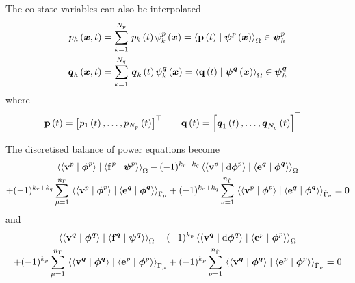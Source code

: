 The co-state variables can also be interpolated \ie
\begin{align}
  \fnof{p_{h}}{\vectr{x},t}&=\gsum{k=1}{N_{p}}{\fnof{p_{k}}{t}\fnof{\psi^{p}_{k}}{\vectr{x}}}=\dualityform{\fnof{\dcovectr{p}}{t}}{\fnof{\covectr{\psi}^{p}}{\vectr{x}}}{\Omega}\in\covectr{\psi}^{p}_{h} \\
  \fnof{\covectr{q}_{h}}{\vectr{x},t}&=\gsum{k=1}{N_{q}}{\fnof{\covectr{q}_{k}}{t}\fnof{\psi^{\covectr{q}}_{k}}{\vectr{x}}}=\dualityform{\fnof{\dcovectr{q}}{t}}{\fnof{\covectr{\psi}^{\covectr{q}}}{\vectr{x}}}{\Omega}\in\covectr{\psi}^{\covectr{q}}_{h}
\end{align}
where
\begin{align}
    \boldsymbol{\mathrm{p}} \left( t \right) = {\left[  p_{1}\left( t \right) ,\ldots, p_{N_{p}}\left( t \right)  \right]}^{ \top } &\qquad  \boldsymbol{\mathrm{q}} \left( t \right) = {\left[   \boldsymbol{q} _{1}\left( t \right) ,\ldots,  \boldsymbol{q} _{N_{q}}\left( t \right)  \right]}^{ \top } 
\end{align}

The discretised balance of power equations become
\begin{multline}
  \dualityform{\dualityform{\dcovectr{v}^{p}}{\covectr{\phi}^{p}}{}}{\dualityform{\dcovectr{f}^{p}}{\covectr{\psi}^{p}}{}}{\Omega}-(-1)^{k_{r}+k_{q}}\dualityform{\dualityform{\dcovectr{v}^{p}}{\exteriorderiv{\covectr{\phi}^{p}}}{}}{\dualityform{\dcovectr{e}^{\covectr{q}}}{\covectr{\phi}^{\covectr{q}}}{}}{\Omega}\\
  +(-1)^{k_{r}+k_{q}}\gsum{\mu=1}{n_{\Gamma}}{\dualityform{\dualityform{\dcovectr{v}^{p}}{\covectr{\phi}^{p}}{}}{\dualityform{\dcovectr{e}^{\covectr{q}}}{\covectr{\phi}^{\covectr{q}}}{}}{\Gamma_{\mu}}}+(-1)^{k_{r}+k_{q}}\gsum{\nu=1}{n_{\hat{\Gamma}}}{\dualityform{\dualityform{\dcovectr{v}^{p}}{\covectr{\phi}^{p}}{}}{\dualityform{\dcovectr{e}^{\covectr{q}}}{\covectr{\phi}^{\covectr{q}}}{}}{\hat{\Gamma}_{\nu}}}=0
\end{multline}
and
\begin{multline}
  \dualityform{\dualityform{\dcovectr{v}^{\covectr{q}}}{\covectr{\phi}^{\covectr{q}}}{}}{\dualityform{\dcovectr{f}^{\covectr{q}}}{\covectr{\psi}^{\covectr{q}}}{}}{\Omega}-(-1)^{k_{p}}\dualityform{\dualityform{\dcovectr{v}^{\covectr{q}}}{\exteriorderiv{\covectr{\phi}^{\covectr{q}}}}{}}{\dualityform{\dcovectr{e}^{p}}{\covectr{\phi}^{p}}{}}{\Omega}\\
  +(-1)^{k_{p}}\gsum{\mu=1}{n_{\Gamma}}{\dualityform{\dualityform{\dcovectr{v}^{\covectr{q}}}{\covectr{\phi}^{\covectr{q}}}{}}{\dualityform{\dcovectr{e}^{p}}{\covectr{\phi}^{p}}{}}{\Gamma_{\mu}}}+(-1)^{k_{p}}\gsum{\nu=1}{n_{\hat{\Gamma}}}{\dualityform{\dualityform{\dcovectr{v}^{\covectr{q}}}{\covectr{\phi}^{\covectr{q}}}{}}{\dualityform{\dcovectr{e}^{p}}{\covectr{\phi}^{p}}{}}{\hat{\Gamma}_{\nu}}}=0
\end{multline}

